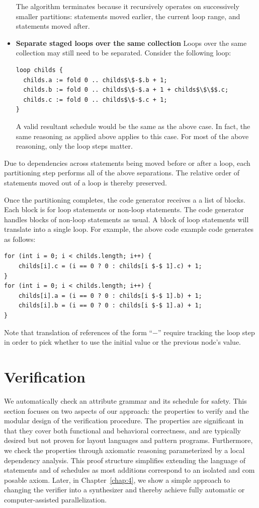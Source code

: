 \begin{itemize}
The algorithm terminates because it recursively operates on successively smaller partitions: statements moved earlier, the current loop range, and statements moved after. 

\item \textbf{Separate staged loops over the same collection} Loops over the same collection may still need to be separated. Consider the following loop:
\begin{lstlisting}[mathescape]
loop childs {
  childs.a := fold 0 .. childs$\$-$.b + 1;
  childs.b := fold 0 .. childs$\$-$.a + 1 + childs$\$\$$.c;
  childs.c := fold 0 .. childs$\$-$.c + 1;
}
\end{lstlisting}
A valid resultant schedule would be the same as the above case. In fact, the same reasoning as applied above applies to this case. For most of the above reasoning, only the loop steps matter. 
\end{itemize}
Due to dependencies across statements being moved before or after a loop, each partitioning step performs all of the above separations. The relative order of statements moved out of a loop is thereby preserved. 

Once the partitioning completes, the code generator receives a a list of blocks. Each block is for loop statements or non-loop statements. The code generator handles blocks of non-loop statements as usual. A block of loop statements will translate into a single loop. For example, the above code example code generates as follows:

\begin{lstlisting}[mathescape]
for (int i = 0; i < childs.length; i++) {
	childs[i].c = (i == 0 ? 0 : childs[i $-$ 1].c) + 1;
}
for (int i = 0; i < childs.length; i++) {
	childs[i].a = (i == 0 ? 0 : childs[i $-$ 1].b) + 1;
	childs[i].b = (i == 0 ? 0 : childs[i $-$ 1].a) + 1;
}
\end{lstlisting}
Note that translation of references of the form ``$-$'' require tracking the loop step in order to pick whether to use the initial value or the previous node's value.


\section{Verification}

We automatically check an attribute grammar and its schedule for safety. This section focuses on two aspects of our approach: the properties to verify and the modular design of the verification procedure. The properties are significant in that they cover both functional and behavioral correctness, and are typically desired but not proven for layout languages and pattern programs. Furthermore, we check the properties through axiomatic reasoning parameterized by a local dependency analysis. This proof structure simplifies extending the language of statements and of schedules as most additions correspond to an isolated and com posable axiom. Later, in Chapter~\ref{chap:4}, we show a simple approach to changing the verifier into a synthesizer and thereby achieve fully automatic or computer-assisted parallelization.

